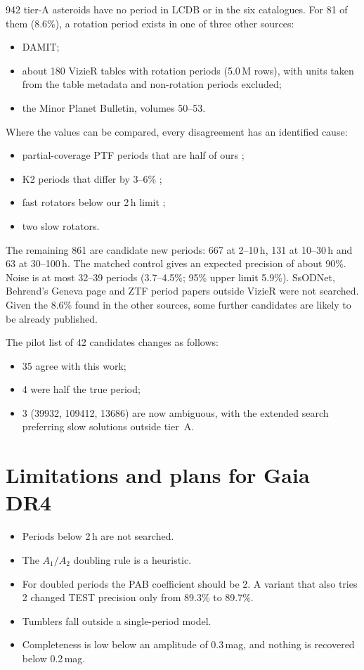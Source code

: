 942 tier-A asteroids have no period in LCDB or in the six catalogues. For 81 of them (8.6\%), a rotation
period exists in one of three other sources:
\begin{itemize}
\item DAMIT;
\item about 180 VizieR tables with rotation periods (5.0\,M rows), with units taken from the table metadata
and non-rotation periods excluded;
\item the Minor Planet Bulletin, volumes 50--53.
\end{itemize}
Where the values can be compared, every disagreement has an identified cause:
\begin{itemize}
\item partial-coverage PTF periods that are half of ours \citep{Chang2016};
\item K2 periods that differ by 3--6\% \citep{Sergeyev2025};
\item fast rotators below our 2\,h limit \citep{Erasmus2019};
\item two slow rotators.
\end{itemize}

The remaining 861 are candidate new periods: 667 at 2--10\,h, 131 at 10--30\,h and 63 at 30--100\,h. The
matched control gives an expected precision of about 90\%. Noise is at most 32--39 periods (3.7--4.5\%; 95\% upper limit 5.9\%). SsODNet, Behrend's Geneva page and
ZTF period papers outside VizieR were not searched. Given the 8.6\% found in the other sources, some
further candidates are likely to be already published.

The pilot list of 42 candidates \citep{Tropynin2026a} changes as follows:
\begin{itemize}
\item 35 agree with this work;
\item 4 were half the true period;
\item 3 (39932, 109412, 13686) are now ambiguous, with the extended search preferring slow solutions
outside tier~A.
\end{itemize}

\section{Limitations and plans for Gaia DR4}

\begin{itemize}
\item Periods below 2\,h are not searched.
\item The $A_1/A_2$ doubling rule is a heuristic.
\item For doubled periods the PAB coefficient should be 2. A variant that also tries 2 changed TEST precision
only from 89.3\% to 89.7\%.
\item Tumblers fall outside a single-period model.
\item Completeness is low below an amplitude of 0.3\,mag, and nothing is recovered below 0.2\,mag.
\end{itemize}

